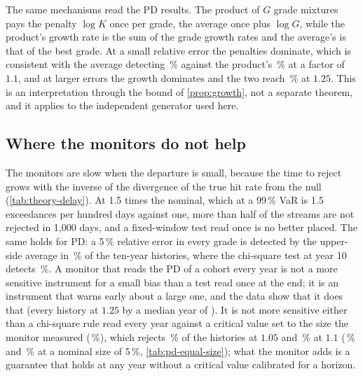 The same mechanisms read the PD results. The product of $G$ grade mixtures pays the penalty $\log K$ once per grade, the average once plus $\log G$, while the product's growth rate is the sum of the grade growth rates and the average's is that of the best grade. At a small relative error the penalties dominate, which is consistent with the average detecting \nPdOneOneAvg\,\% against the product's \nPdOneOneProd\,\% at a factor of $1.1$, and at larger errors the growth dominates and the two reach \nPdOneTwoFiveProd\,\% at $1.25$. This is an interpretation through the bound of \cref{prop:growth}, not a separate theorem, and it applies to
the independent generator used here.

\subsection{Where the monitors do not help}
\label{sec:discussion-failure}

The monitors are slow when the departure is small, because the time to reject grows with the inverse of the divergence of the true hit rate from the null (\cref{tab:theory-delay}). At 1.5 times the nominal, which at a 99\,\% VaR is 1.5 exceedances per hundred days against one, more than half of the streams are not rejected in 1,000 days, and a fixed-window test read once is no better placed. The same holds for PD: a 5\,\% relative error in every grade is detected by the upper-side average in \nPdOneZeroFiveAvgUp\,\% of the ten-year histories, where the chi-square test at year 10 detects \nPdOneZeroFiveChiOne\,\%. A monitor that reads the PD of
a cohort every year is not a more sensitive instrument for a small bias than a test read once at the end; it is an instrument that warns early about a large one, and the data show that it does that (every history at $1.25$ by a median year of \nPdMedYearOneTwoFive). It is not more sensitive either than a chi-square rule read every year against a critical value set to the size the monitor measured (\nPdcMatchedSize\,\%), which rejects \nPdcOneZeroFiveChiMatched\,\% of the histories at $1.05$ and \nPdcOneOneChiMatched\,\% at $1.1$ (\nPdcOneZeroFiveChiSim\,\% and \nPdcOneOneChiSim\,\% at a nominal size of 5\,\%, \cref{tab:pd-equal-size}); what the monitor adds is a guarantee that holds at any year without a critical value calibrated for a horizon.

